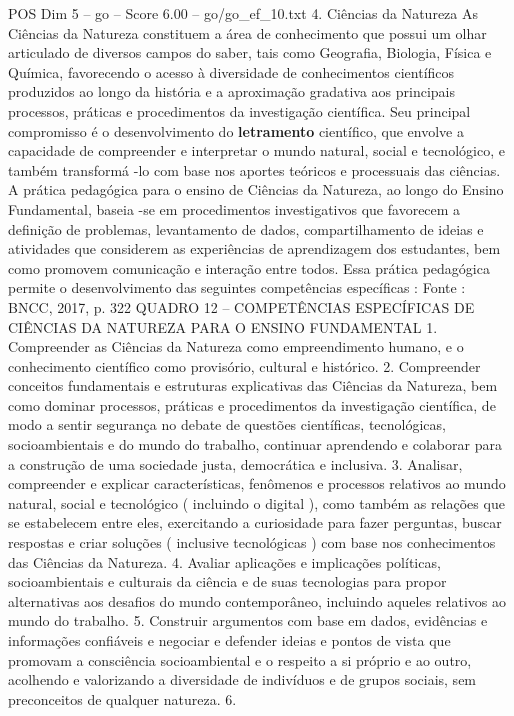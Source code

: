 \begin{textsample}{POS Dim 5 – go – Score 6.00 – go/go\_ef\_10.txt}  \label{ex:f5_pos_014}
4.
Ciências da Natureza As Ciências da Natureza constituem a área de conhecimento que possui um olhar articulado de diversos campos do saber, tais como Geografia, Biologia, Física e Química, favorecendo o acesso à diversidade de conhecimentos científicos produzidos ao longo da história e a aproximação gradativa aos principais processos, práticas e procedimentos da investigação científica.
Seu principal compromisso é o desenvolvimento do \textbf{letramento} científico, que envolve a capacidade de compreender e interpretar o mundo natural, social e tecnológico, e também transformá -lo com base nos aportes teóricos e processuais das ciências.
A prática pedagógica para o ensino de Ciências da Natureza, ao longo do Ensino Fundamental, baseia -se em procedimentos investigativos que favorecem a definição de problemas, levantamento de dados, compartilhamento de ideias e atividades que considerem as experiências de aprendizagem dos estudantes, bem como promovem comunicação e interação entre todos.
Essa prática pedagógica permite o desenvolvimento das seguintes competências específicas : Fonte : BNCC, 2017, p. 322 QUADRO 12 – COMPETÊNCIAS ESPECÍFICAS DE CIÊNCIAS DA NATUREZA PARA O ENSINO FUNDAMENTAL 1.
Compreender as Ciências da Natureza como empreendimento humano, e o conhecimento científico como provisório, cultural e histórico. 2.
Compreender conceitos fundamentais e estruturas explicativas das Ciências da Natureza, bem como dominar processos, práticas e procedimentos da investigação científica, de modo a sentir segurança no debate de questões científicas, tecnológicas, socioambientais e do mundo do trabalho, continuar aprendendo e colaborar para a construção de uma sociedade justa, democrática e inclusiva. 3.
Analisar, compreender e explicar características, fenômenos e processos relativos ao mundo natural, social e tecnológico ( incluindo o digital ), como também as relações que se estabelecem entre eles, exercitando a curiosidade para fazer perguntas, buscar respostas e criar soluções ( inclusive tecnológicas ) com base nos conhecimentos das Ciências da Natureza. 4.
Avaliar aplicações e implicações políticas, socioambientais e culturais da ciência e de suas tecnologias para propor alternativas aos desafios do mundo contemporâneo, incluindo aqueles relativos ao mundo do trabalho. 5.
Construir argumentos com base em dados, evidências e informações confiáveis e negociar e defender ideias e pontos de vista que promovam a consciência socioambiental e o respeito a si próprio e ao outro, acolhendo e valorizando a diversidade de indivíduos e de grupos sociais, sem preconceitos de qualquer natureza. 6.

\end{textsample}
